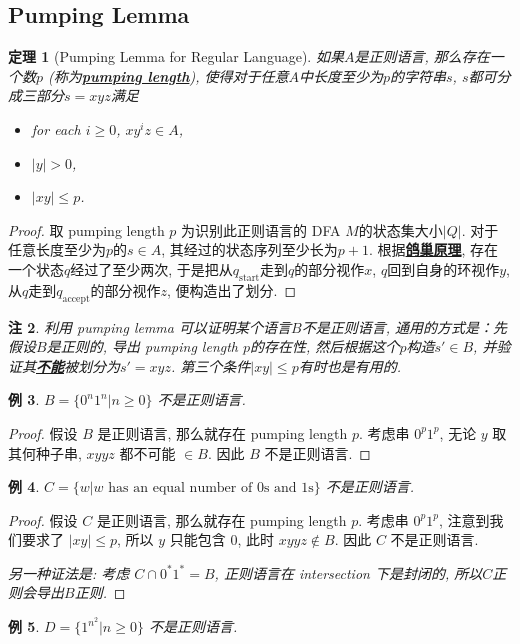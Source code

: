 \documentclass[8pt]{article}
\theoremstyle{compact}
\newtheorem{theorem}{定理}[section]
\newtheorem{example}[theorem]{例}
\newtheorem{remark}[theorem]{注}
\def\obj#1{\textbf{\uline{#1}}}
\def\le{\leqslant}
\def\ge{\geqslant}
\begin{document}
\subsection{Pumping Lemma}
\begin{theorem}[Pumping Lemma for Regular Language]
	如果$A$是正则语言, 那么存在一个数$p$ (称为\obj{pumping length}), 使得对于任意$A$中长度至少为$p$的字符串$s$, $s$都可分成三部分$s = xyz$满足
	\begin{itemize}
		\item for each $i \ge 0$, $xy^iz \in A$,
		\item $|y| > 0$,
		\item $|xy| \le p$.
	\end{itemize}
\end{theorem}
\begin{proof}
	取 pumping length $p$ 为识别此正则语言的 DFA $M$的状态集大小$|Q|$. 对于任意长度至少为$p$的$s \in A$, 其经过的状态序列至少长为$p+1$. 根据\obj{鸽巢原理}, 存在一个状态$q$经过了至少两次, 于是把从$q_{\text{start}}$走到$q$的部分视作$x$, $q$回到自身的环视作$y$, 从$q$走到$q_{\text{accept}}$的部分视作$z$, 便构造出了划分. 
\end{proof}
\begin{remark}
	利用 pumping lemma 可以证明某个语言$B$不是正则语言, 通用的方式是：先假设$B$是正则的, 导出 pumping length $p$的存在性, 然后根据这个$p$构造$s' \in B$, 并验证其\obj{不能}被划分为$s' = xyz$. 第三个条件$|xy| \le p$有时也是有用的. 
\end{remark}
\begin{example}
	$B = \{0^n1^n | n \ge 0\}$ 不是正则语言.
\end{example}
\begin{proof}
	假设 $B$ 是正则语言, 那么就存在 pumping length $p$. 考虑串 $0^p1^p$, 无论 $y$ 取其何种子串, $xyyz$ 都不可能 $\in B$. 因此 $B$ 不是正则语言.
\end{proof}
\begin{example}
	$C = \{w | w \text{ has an equal number of 0s and 1s}\}$ 不是正则语言.
\end{example}
\begin{proof}
	假设 $C$ 是正则语言, 那么就存在 pumping length $p$. 考虑串 $0^p1^p$, 注意到我们要求了 $|xy| \le p$, 所以 $y$ 只能包含 $0$, 此时 $xyyz \notin B$. 因此 $C$ 不是正则语言.
	
	\textit{另一种证法是: 考虑 $C \cap 0^*1^* = B$, 正则语言在 intersection 下是封闭的, 所以$C$正则会导出$B$正则.}
\end{proof}
\begin{example}
	$D = \{1^{n^2} | n \ge 0\}$ 不是正则语言.
\end{example}
\end{document}
